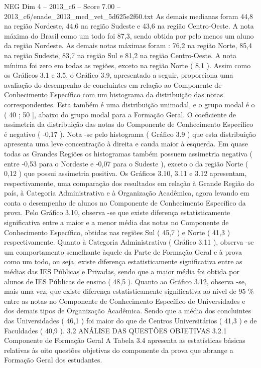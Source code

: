 \begin{textsample}{NEG Dim 4 – 2013\_c6 – Score 7.00 – 2013\_c6/enade\_2013\_med\_vet\_5d625e2f60.txt}
As demais medianas foram 44,8 na região Nordeste, 44,6 na região Sudeste e 43,6 na região Centro-Oeste.
A nota máxima do Brasil como um todo foi 87,3, sendo obtida por pelo menos um aluno da região Nordeste.
As demais notas máximas foram : 76,2 na região Norte, 85,4 na região Sudeste, 83,7 na região Sul e 81,2 na região Centro-Oeste.
A nota mínima foi zero em todas as regiões, exceto na região Norte ( 8,1 ).
Assim como os Gráficos 3.1 e 3.5, o Gráfico 3.9, apresentado a seguir, proporciona uma avaliação do desempenho de concluintes em relação ao Componente de Conhecimento Específico com um histograma da distribuição das notas correspondentes.
Esta também é uma distribuição unimodal, e o grupo modal é o ( 40 ; 50 ], abaixo do grupo modal para a Formação Geral.
O coeficiente de assimetria da distribuição das notas do Componente de Conhecimento Específico é negativo ( -0,17 ).
Nota -se pelo histograma ( Gráfico 3.9 ) que esta distribuição apresenta uma leve concentração à direita e cauda maior à esquerda.
Em quase todas as Grandes Regiões os histogramas também possuem assimetria negativa ( entre -0,53 para o Nordeste e -0,07 para o Sudeste ), exceto o da região Norte ( 0,12 ) que possui assimetria positiva.
Os Gráficos 3.10, 3.11 e 3.12 apresentam, respectivamente, uma comparação dos resultados em relação à Grande Região do país, à Categoria Administrativa e à Organização Acadêmica, agora levando em conta o desempenho de alunos no Componente de Conhecimento Específico da prova.
Pelo Gráfico 3.10, observa -se que existe diferença estatisticamente significativa entre a maior e a menor média das notas no Componente de Conhecimento Específico, obtidas nas regiões Sul ( 45,7 ) e Norte ( 41,3 ) respectivamente.
Quanto à Categoria Administrativa ( Gráfico 3.11 ), observa -se um comportamento semelhante àquele da Parte de Formação Geral e à prova como um todo, ou seja, existe diferença estatisticamente significativa entre as médias das IES Públicas e Privadas, sendo que a maior média foi obtida por alunos de IES Públicas de ensino ( 48,5 ).
Quanto ao Gráfico 3.12, observa -se, mais uma vez, que existe diferença estatisticamente significativa ao nível de 95 \% entre as notas no Componente de Conhecimento Específico de Universidades e dos demais tipos de Organização Acadêmica.
Sendo que a média dos concluintes das Universidades ( 46,1 ) foi maior do que de Centros Universitários ( 41,3 ) e de Faculdades ( 40,9 ). 3.2 ANÁLISE DAS QUESTÕES OBJETIVAS 3.2.1 Componente de Formação Geral A Tabela 3.4 apresenta as estatísticas básicas relativas às oito questões objetivas do componente da prova que abrange a Formação Geral dos estudantes.

\end{textsample}

